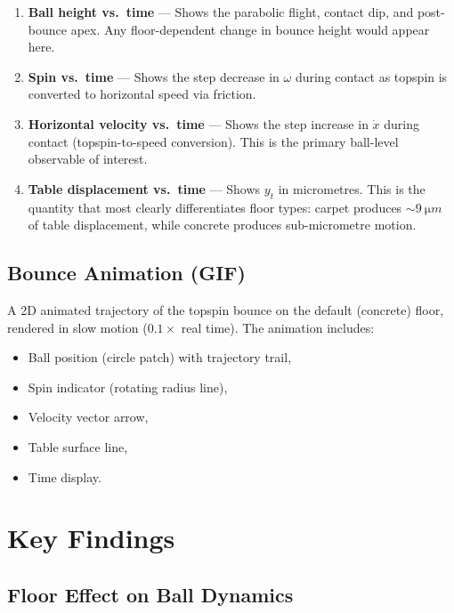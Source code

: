 \documentclass[11pt,a4paper]{article}
\begin{document}
\begin{enumerate}[nosep]
  \item \textbf{Ball height vs.\ time} --- Shows the parabolic flight,
    contact dip, and post-bounce apex. Any floor-dependent change in bounce
    height would appear here.
  \item \textbf{Spin vs.\ time} --- Shows the step decrease in $\omega$
    during contact as topspin is converted to horizontal speed via friction.
  \item \textbf{Horizontal velocity vs.\ time} --- Shows the step increase in
    $\dot{x}$ during contact (topspin-to-speed conversion). This is the
    primary ball-level observable of interest.
  \item \textbf{Table displacement vs.\ time} --- Shows $y_t$ in
    micrometres. This is the quantity that most clearly differentiates floor
    types: carpet produces ${\sim}\SI{9}{\micro m}$ of table displacement,
    while concrete produces sub-micrometre motion.
\end{enumerate}

\subsection{Bounce Animation (GIF)}

A 2D animated trajectory of the topspin bounce on the default (concrete)
floor, rendered in slow motion ($0.1\times$ real time). The animation
includes:
\begin{itemize}[nosep]
  \item Ball position (circle patch) with trajectory trail,
  \item Spin indicator (rotating radius line),
  \item Velocity vector arrow,
  \item Table surface line,
  \item Time display.
\end{itemize}

\section{Key Findings}

\subsection{Floor Effect on Ball Dynamics}
\end{document}
